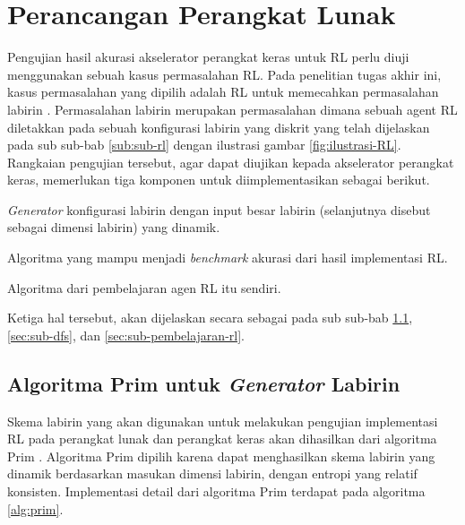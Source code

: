 \section{Perancangan Perangkat Lunak}
\label{sec:perancangan-perangkat-lunak}

Pengujian hasil akurasi akselerator perangkat keras untuk \ac{RL} perlu diuji menggunakan sebuah kasus permasalahan \ac{RL}. Pada penelitian tugas akhir ini, kasus permasalahan yang dipilih adalah \ac{RL} untuk memecahkan permasalahan labirin \parencite{mini2023understanding}. Permasalahan labirin merupakan permasalahan dimana sebuah agent \ac{RL} diletakkan pada sebuah konfigurasi labirin yang diskrit yang telah dijelaskan pada sub sub-bab \ref{sub:sub-rl} dengan ilustrasi gambar \ref{fig:ilustrasi-RL}. Rangkaian pengujian tersebut, agar dapat diujikan kepada akselerator perangkat keras, memerlukan tiga komponen untuk diimplementasikan sebagai berikut.

\vspace{-5mm}
\begin{enumerate}
\end{enumerate}

Ketiga hal tersebut, akan dijelaskan secara sebagai pada sub sub-bab \ref{sec:sub-prim}, \ref{sec:sub-dfs}, dan \ref{sec:sub-pembelajaran-rl}.

\subsection{Algoritma Prim untuk \textit{Generator} Labirin}
\label{sec:sub-prim}

Skema labirin yang akan digunakan untuk melakukan pengujian implementasi \ac{RL} pada perangkat lunak dan perangkat keras akan dihasilkan dari algoritma Prim \parencite{devian2013implementasi}. Algoritma Prim dipilih karena dapat menghasilkan skema labirin yang dinamik berdasarkan masukan dimensi labirin, dengan entropi yang relatif konsisten. Implementasi detail dari algoritma Prim terdapat pada algoritma \ref{alg:prim}.

